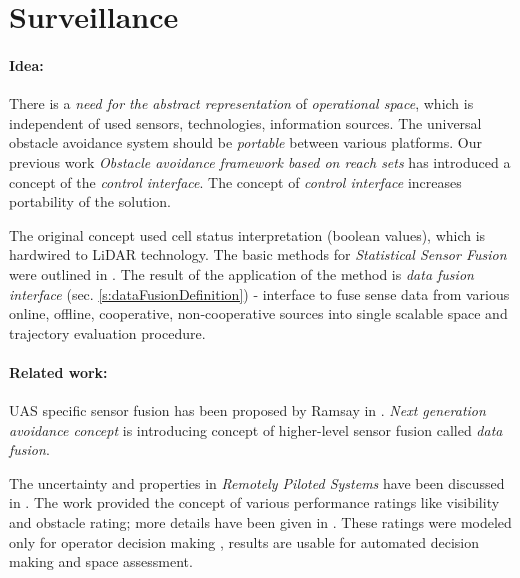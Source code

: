 \section{Surveillance}\label{s:dataFusionProbabilisticModelTheory}
\paragraph{Idea:}  There is a \emph{need for the abstract representation} of \emph{operational space}, which is independent of used sensors, technologies, information sources. The universal obstacle avoidance system should be \emph{portable} between various platforms. Our previous work \emph{Obstacle avoidance framework based on reach sets} \cite{gomola2017obstacle} has introduced a concept of the \emph{control interface}. The concept of \emph{control interface} increases portability of the solution.

The original concept used cell status interpretation (boolean values), which is hardwired to LiDAR technology. The basic methods for \emph{Statistical Sensor Fusion} were outlined in \cite{gustafsson2010statistical}. The result of the application of the method is \emph{data fusion interface} (sec. \ref{s:dataFusionDefinition}) - interface to fuse sense data from various online, offline, cooperative, non-cooperative sources into single scalable {space and trajectory evaluation procedure}.
    
\paragraph{Related work:} \noindent UAS specific sensor fusion has been proposed by Ramsay in \cite{ramasamy2014avionics}. \emph{Next generation avoidance concept} \cite{ramasamy2014next} is introducing concept of higher-level sensor fusion called \emph{data fusion}. 

The uncertainty and properties in \emph{Remotely Piloted Systems} have been discussed in \cite{chynchenko2016remotely}. The work provided the concept of various performance ratings like visibility and obstacle rating; more details have been given in \cite{shmelova2016modeling}. These ratings were modeled only for operator decision making \cite{kharchenko2017modelling}, results are usable for automated decision making and space assessment. 




